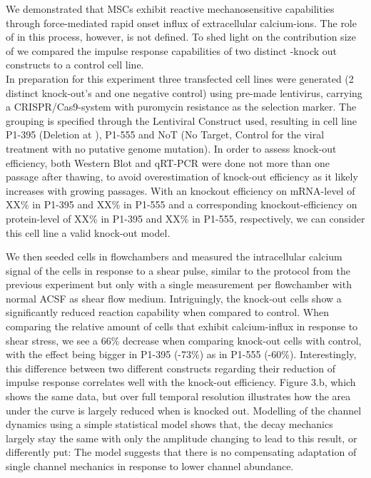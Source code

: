 We demonstrated that MSCs exhibit reactive mechanosensitive capabilities through force-mediated rapid onset influx of extracellular calcium-ions. The role of \Piezo{} in this process, however, is not defined. To shed light on the contribution size of \Piezo{} we compared the impulse response capabilities of two distinct \Piezo{}-knock out constructs to a control cell line.\\
In preparation for this experiment three transfected cell lines were generated (2 distinct \Piezo{} knock-out's and one negative control) using pre-made lentivirus, carrying a CRISPR/Cas9-system with puromycin resistance as the selection marker. The grouping is specified through the Lentiviral Construct used, resulting in cell line P1-395 (Deletion at ), P1-555 and NoT (No Target, Control for the viral treatment with no putative genome mutation).  In order to assess knock-out efficiency, both Western Blot and qRT-PCR were done not more than one passage after thawing, to avoid overestimation of knock-out efficiency as it likely increases with growing passages. With an knockout efficiency on mRNA-level of XX\% in P1-395 and XX\% in P1-555 and a corresponding knockout-efficiency on protein-level of XX\% in P1-395 and XX\% in P1-555, respectively, we can consider this cell line a valid knock-out model.  

We then seeded cells in flowchambers and measured the intracellular calcium signal of the cells in response to a shear pulse, similar to the protocol from the previous experiment but only with a single measurement per flowchamber with normal ACSF as shear flow medium. Intriguingly, the knock-out cells show a significantly reduced reaction capability when compared to control.  When comparing the relative amount of cells that exhibit calcium-influx in response to shear stress, we see a 66\% decrease when comparing knock-out cells with control, with the effect being bigger in P1-395 (-73\%) as in P1-555 (-60\%). Interestingly, this difference between two different constructs regarding their reduction of impulse response correlates well with the knock-out efficiency. Figure 3.b, which shows the same data, but over full temporal resolution illustrates how the area under the curve is largely reduced when \Piezo{} is knocked out. Modelling of the channel dynamics using a simple statistical model shows that, the decay mechanics largely stay the same with only the amplitude changing to lead to this result, or differently put: The model suggests that there is no compensating adaptation of single channel mechanics in response to lower channel abundance.

